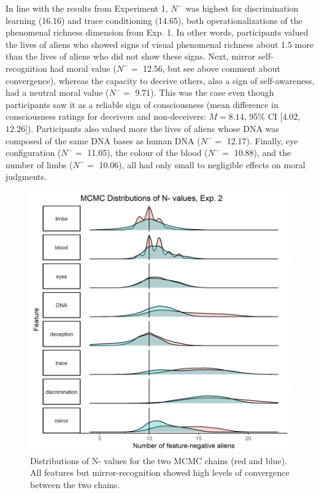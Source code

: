\documentclass[10pt, letterpaper]{article}
\newenvironment{CodeChunk}{}{}
\begin{document}
In line with the results from Experiment 1, \(N^-\) was highest for
discrimination learning (16.16) and trace conditioning (14.65), both
operationalizations of the phenomenal richness dimension from Exp. 1. In
other words, participants valued the lives of aliens who showed signs of
visual phenomenal richness about 1.5 more than the lives of aliens who
did not show these signs. Next, mirror self-recognition had moral value
(\(N^-=\) 12.56, but see above comment about convergence), whereas the
capacity to deceive others, also a sign of self-awareness, had a neutral
moral value (\(N^-=\) 9.71). This was the case even though participants
saw it as a reliable sign of consciousness (mean difference in
consciousness ratings for deceivers and non-deceivers: \(M = 8.14\),
95\% CI \([4.02\), \(12.26]\)). Participants also valued more the lives
of aliens whose DNA was composed of the same DNA bases as human DNA
(\(N^-=\) 12.17). Finally, eye configuration (\(N^-=\) 11.05), the
colour of the blood (\(N^-=\) 10.88), and the number of limbs (\(N^-=\)
10.06), all had only small to negligible effects on moral judgments.

\begin{CodeChunk}
\begin{figure}[H]

{\centering \includegraphics{figs/mwjplot2-1} 

}

\caption[Distributions of N- values for the two MCMC chains (red and blue)]{Distributions of N- values for the two MCMC chains (red and blue). All features but mirror-recognition showed high levels of convergence between the two chains.}\label{fig:mwjplot2}
\end{figure}
\end{CodeChunk}
\end{document}
